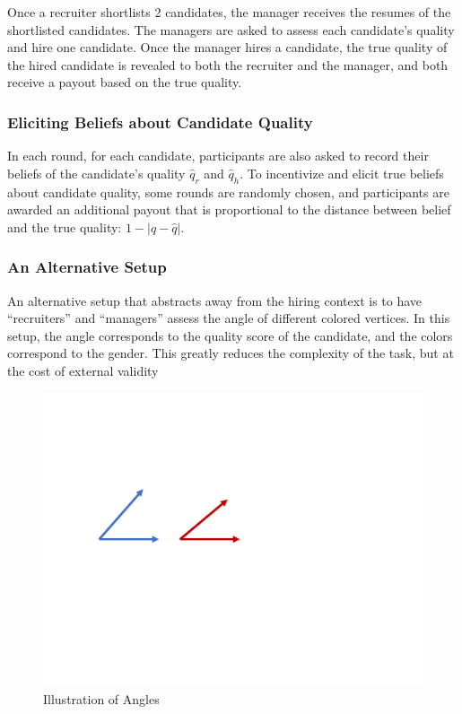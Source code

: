 \documentclass[11pt]{article}
\begin{document}
Once a recruiter shortlists 2 candidates, the manager receives the resumes of the shortlisted candidates. The managers are asked to assess each candidate's quality and hire one candidate. Once the manager hires a candidate, the true quality of the hired candidate is revealed to both the recruiter and the manager, and both receive a payout based on the true quality.

\subsubsection*{Eliciting Beliefs about Candidate Quality}

In each round, for each candidate, participants are also asked to record their beliefs of the candidate's quality $\hat{q}_r$ and $\hat{q}_h$. To incentivize and elicit true beliefs about candidate quality, some rounds are randomly chosen, and participants are awarded an additional payout that is proportional to the distance between belief and the true quality: $1-|q - \hat{q}|$.

\subsubsection*{An Alternative Setup}

An alternative setup that abstracts away from the hiring context is to have ``recruiters'' and ``managers'' assess the angle of different colored vertices. In this setup, the angle corresponds to the quality score of the candidate, and the colors correspond to the gender. This greatly reduces the complexity of the task, but at the cost of external validity

\begin{figure}[H] %
    \centering
    \includegraphics[width=\textwidth, keepaspectratio]{illus/angles.pdf}
    \caption{Illustration of Angles}
    \label{sample_angles}
\end{figure}
\end{document}
